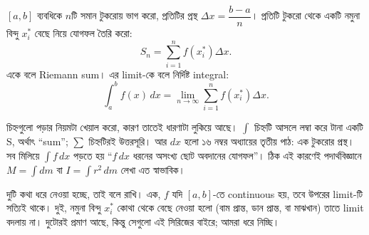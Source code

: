 \documentclass[11pt]{article}
\begin{document}
\begin{center}
\end{center}

\begin{idea}
$[a,b]$ ব্যবধিকে $n$টি সমান টুকরোয় ভাগ করো, প্রতিটির প্রস্থ
$\Delta x = \dfrac{b-a}{n}$। প্রতিটি টুকরো থেকে একটি নমুনা বিন্দু $x_{i}^{*}$
বেছে নিয়ে যোগফল তৈরি করো:
\[
  S_{n} = \sum_{i=1}^{n} f\left( x_{i}^{*} \right)\Delta x .
\]
একে বলে Riemann sum। এর limit-কে বলে নির্দিষ্ট integral:
\[
  \int_{a}^{b} f(x)\,dx = \lim_{n \to \infty} \sum_{i=1}^{n}
  f\left( x_{i}^{*} \right)\Delta x .
\]
\end{idea}

চিহ্নগুলো পড়ার নিয়মটা খেয়াল করো, কারণ তাতেই ধারণাটা লুকিয়ে আছে। $\int$
চিহ্নটি আসলে লম্বা করে টানা একটি S, অর্থাৎ ``sum''; $\sum$ চিহ্নটিরই উত্তরসূরি।
আর $dx$ হলো ১৬ নম্বর অধ্যায়ের তৃতীয় পাঠ: এক টুকরোর প্রস্থ। সব মিলিয়ে
$\int f\,dx$ পড়তে হয় ``$f\,dx$ ধরনের অসংখ্য ছোট অবদানের যোগফল''। ঠিক এই কারণেই
পদার্থবিজ্ঞানে $M = \int dm$ বা $I = \int r^{2}\,dm$ লেখা এত স্বাভাবিক।

দুটি কথা ধরে নেওয়া হচ্ছে, তাই বলে রাখি। এক, $f$ যদি $[a,b]$-তে continuous হয়,
তবে উপরের limit-টি সত্যিই থাকে। দুই, নমুনা বিন্দু $x_{i}^{*}$ কোথা থেকে বেছে
নেওয়া হলো (বাম প্রান্ত, ডান প্রান্ত, বা মাঝখান) তাতে limit বদলায় না। দুটোরই
প্রমাণ আছে, কিন্তু সেগুলো এই সিরিজের বাইরে; আমরা ধরে নিচ্ছি।
\end{document}
